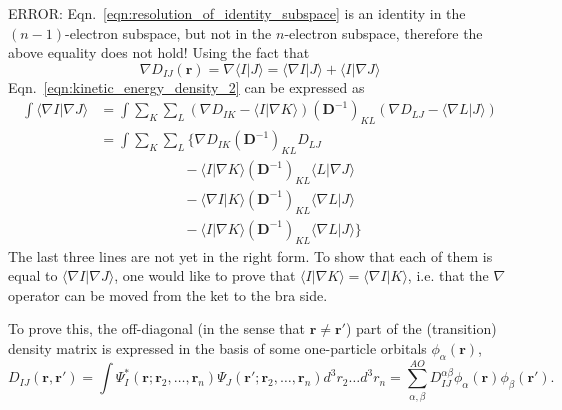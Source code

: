 \documentclass[journal=jacsat,manuscript=article]{achemso}
\newcommand\m[1]{\mathbf{#1}}
\renewcommand\vec[1]{\mathbf{#1}}
\begin{document}
{\color{red} ERROR: Eqn.~\ref{eqn:resolution_of_identity_subspace} is an identity in the $(n-1)$-electron subspace, but not in the $n$-electron subspace, therefore the above equality does not hold!}
Using the fact that
\begin{equation}
\nabla D_{IJ}(\vec{r}) = \nabla \langle I \vert J \rangle = \langle \nabla I \vert J \rangle + \langle I \vert \nabla J \rangle
\end{equation}
Eqn.~\ref{eqn:kinetic_energy_density_2} can be expressed as
\begin{equation}
\begin{split}
  \int \langle \nabla I \vert \nabla J \rangle
  &= \int \sum_K \sum_L
  \left(\nabla D_{IK} - \langle I \vert \nabla K \rangle \right)
  \left( \m{D}^{-1} \right)_{KL}
  \left(\nabla D_{LJ} - \langle \nabla L \vert J \rangle \right) \\
  &= \int \sum_K \sum_L
  \Big\{
  \nabla D_{IK} \left(\m{D}^{-1}\right)_{KL} D_{LJ} \\
  & \quad \quad \quad \quad \quad \quad
  - \langle I \vert \nabla K \rangle \left(\m{D}^{-1}\right)_{KL} \langle L \vert \nabla J \rangle \\
  & \quad \quad \quad \quad \quad \quad
  - \langle \nabla I \vert K \rangle \left(\m{D}^{-1}\right)_{KL} \langle \nabla L \vert J \rangle \\
  & \quad \quad \quad \quad \quad \quad
  - \langle I \vert \nabla K \rangle \left(\m{D}^{-1}\right)_{KL} \langle \nabla L \vert J \rangle
  \Big\}
\end{split} \label{eqn:kinetic_energy_density_3}
\end{equation}
The last three lines are not yet in the right form. To show that each of them is equal to $\langle \nabla I \vert \nabla J \rangle$, one would like to prove that $\langle I \vert \nabla K \rangle = \langle \nabla I \vert K \rangle$, i.e. that the $\nabla$ operator can be moved from the ket to the bra side.

To prove this, the off-diagonal (in the sense that $\vec{r} \neq \vec{r}'$) part of the (transition) density matrix is expressed in the basis of some one-particle orbitals $\phi_{\alpha}(\vec{r})$,
\begin{equation}
D_{IJ}(\vec{r},\vec{r}') = \int \Psi_I^*(\vec{r};\vec{r}_2,\ldots,\vec{r}_n) \Psi_J(\vec{r}';\vec{r}_2,\ldots,\vec{r}_n) d^3\!r_2 \ldots d^3\!r_n = \sum_{\alpha,\beta}^{AO} D_{IJ}^{\alpha\beta} \phi_{\alpha}(\vec{r}) \phi_{\beta}(\vec{r}').
\end{equation}
\end{document}
